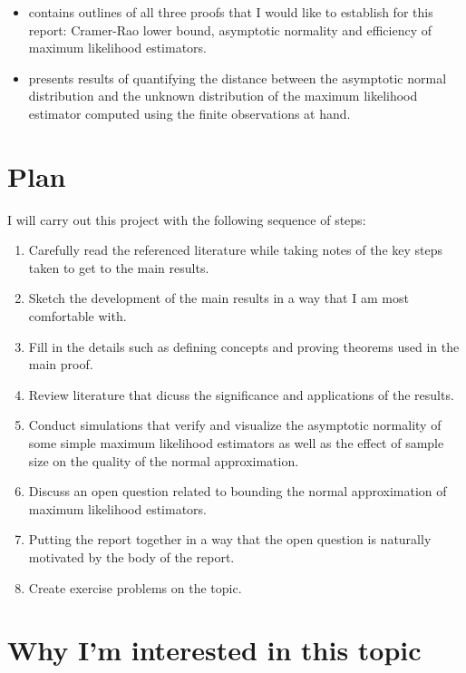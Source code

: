 \documentclass[]{STAT_547C}
\begin{document}
\begin{itemize}
  \item \cite{hogg2005introduction} contains outlines of all three proofs that I would like to establish for this report: Cramer-Rao lower bound, asymptotic normality and efficiency of maximum likelihood estimators.
  \item \cite{anastasiou2015bounds} presents results of quantifying the distance between the asymptotic normal distribution and the unknown distribution of the maximum likelihood estimator computed using the finite observations at hand.
\end{itemize}

\section{Plan}

I will carry out this project with the following sequence of steps: 
\begin{enumerate}
  \item Carefully read the referenced literature while taking notes of the key steps taken to get to the main results.
  \item Sketch the development of the main results in a way that I am most comfortable with.
  \item Fill in the details such as defining concepts and proving theorems used in the main proof.
  \item Review literature that dicuss the significance and applications of the results.
  \item Conduct simulations that verify and visualize the asymptotic normality of some simple maximum likelihood estimators as well as the effect of sample size on the quality of the normal approximation.
  \item Discuss an open question related to bounding the normal approximation of maximum likelihood estimators.
  \item Putting the report together in a way that the open question is naturally motivated by the body of the report.
  \item Create exercise problems on the topic.
\end{enumerate}

\section{Why I'm interested in this topic}
\end{document}

